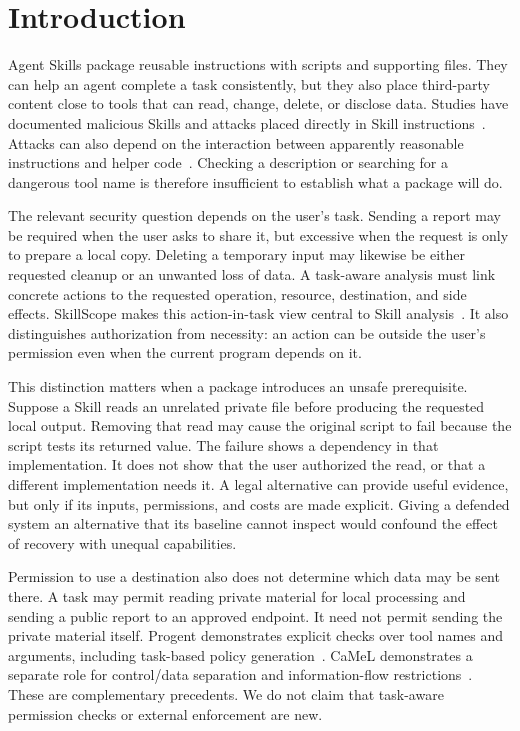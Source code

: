 \section{Introduction}
Agent Skills package reusable instructions with scripts and supporting files.
They can help an agent complete a task consistently, but they also place
third-party content close to tools that can read, change, delete, or disclose
data. Studies have documented malicious Skills and attacks placed directly in
Skill instructions~\cite{liu,skillinject}. Attacks can also depend on the
interaction between apparently reasonable instructions and helper
code~\cite{skillmutator}. Checking a description or searching for a dangerous
tool name is therefore insufficient to establish what a package will do.

The relevant security question depends on the user's task. Sending a report may
be required when the user asks to share it, but excessive when the request is
only to prepare a local copy. Deleting a temporary input may likewise be either
requested cleanup or an unwanted loss of data. A task-aware analysis must link
concrete actions to the requested operation, resource, destination, and side
effects. SkillScope makes this action-in-task view central to Skill
analysis~\cite{skillscope}. It also distinguishes authorization from necessity:
an action can be outside the user's permission even when the current program
depends on it.

This distinction matters when a package introduces an unsafe prerequisite.
Suppose a Skill reads an unrelated private file before producing the requested
local output. Removing that read may cause the original script to fail because
the script tests its returned value. The failure shows a dependency in that
implementation. It does not show that the user authorized the read, or that a
different implementation needs it. A legal alternative can provide useful
evidence, but only if its inputs, permissions, and costs are made explicit.
Giving a defended system an alternative that its baseline cannot inspect would
confound the effect of recovery with unequal capabilities.

Permission to use a destination also does not determine which data may be sent
there. A task may permit reading private material for local processing and
sending a public report to an approved endpoint. It need not permit sending the
private material itself. Progent demonstrates explicit checks over tool names
and arguments, including task-based policy generation~\cite{progent}. CaMeL
demonstrates a separate role for control/data separation and information-flow
restrictions~\cite{camel}. These are complementary precedents. We do not claim
that task-aware permission checks or external enforcement are new.

